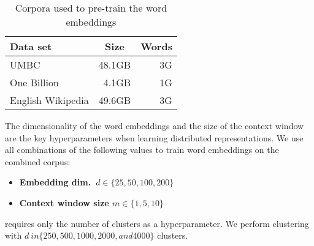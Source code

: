 \begin{table}[t]
\centering
\begin{tabular}{lrr}
\hline
\textbf{Data set} & \multicolumn{1}{c}{\textbf{Size}} & \multicolumn{1}{c}{\textbf{Words}} \\ \hline
UMBC 	& 48.1GB & 3G \\
One Billion 	& 4.1GB & 1G  \\
English Wikipedia & 49.6GB & 3G \\ \hline
\end{tabular}
\caption{Corpora used to pre-train the word embeddings}
\label{wordEmbedCorpora}
\end{table}

The dimensionality of the word embeddings and the size of the context
window are the key hyperparameters when learning distributed
representations. We use all combinations of the following values to
train word embeddings on the combined corpus:
\begin{itemize}
\item \textbf{Embedding dim.\ $d \in \{25, 50, 100, 200\}$}
\item \textbf{Context window size $m \in \{1, 5, 10\}$}
\end{itemize}
\brown requires only the number of clusters as a hyperparameter. We
perform clustering with $d\ in \{250, 500, 1000, 2000, and 4000\}$ clusters.
%
%
%
%
%
